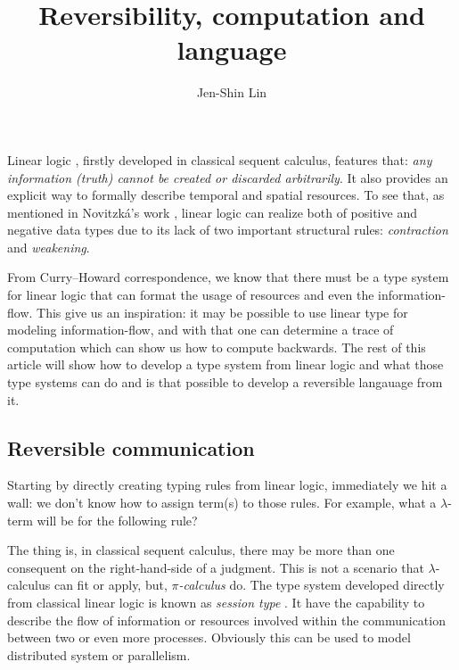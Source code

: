 \documentclass[a4paper,twocolumn]{article}
\title{Reversibility, computation and language}
\author{Jen-Shin Lin}
\begin{document}
\maketitle

Linear logic \cite{Girard95}, firstly developed in classical sequent calculus, features that: \textit{any information (truth) cannot be created or discarded arbitrarily}. It also provides an explicit way to formally describe temporal and spatial resources. To see that, as mentioned in Novitzk\'{a}'s work \cite{Novitzka07}, linear logic can realize both of positive and negative data types due to its lack of two important structural rules: \textit{contraction} and \textit{weakening}.

From Curry–Howard correspondence, we know that there must be a type system for linear logic that can format the usage of resources and even the information-flow. This give us an inspiration: it may be possible to use linear type for modeling information-flow, and with that one can determine a trace of computation which can show us how to compute backwards. The rest of this article will show how to develop a type system from linear logic and what those type systems can do and is that possible to develop a reversible langauage from it.

\subsection*{Reversible communication}

Starting by directly creating typing rules from linear logic, immediately we hit a wall: we don't know how to assign term(s) to those rules. For example, what a $\lambda$-term will be for the following rule?

\begin{prooftree}
\end{prooftree}

The thing is, in classical sequent calculus, there may be more than one consequent on the right-hand-side of a judgment. This is not a scenario that $\lambda$-calculus can fit or apply, but, \textit{$\pi$-calculus} do. The type system developed directly from classical linear logic is known as \textit{session type} \cite{Wadler12}. It have the capability to describe the flow of information or resources involved within the communication between two or even more processes. Obviously this can be used to model distributed system or parallelism.
\end{document}
